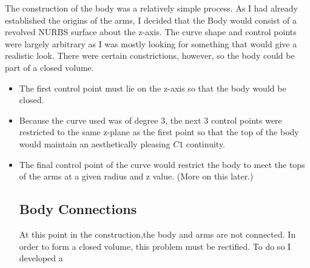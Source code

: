 \documentclass[twocolumn]{article}
\begin{document}
The construction of the body was a relatively simple process. As I had already established the origins of the arms, I decided that the Body would consist of a revolved NURBS surface about the z-axis. The curve shape and control points were largely arbitrary as I was mostly looking for something that would give a realistic look. There were certain constrictions, however, so the body could be part of a closed volume. 

\begin{center}
\begin{itemize}
\item The first control point must lie on the z-axis so that the body would be closed.
\item Because the curve used was of degree 3, the next 3 control points were restricted to the same z-plane as the first point so that the top of the body would maintain an aesthetically pleasing $C1$ continuity.
\item The final control point of the curve would restrict the body to meet the tops of the arms at a given radius and z value. (More on this later.)


\subsection{Body Connections} 

At this point in the construction,the body and arms are not connected. In order to form a closed volume, this problem must be rectified. To do so I developed a 
\end{itemize}
\end{center}
\end{document}
